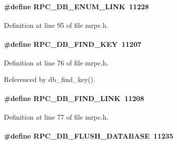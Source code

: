 \paragraph[{RPC\_\-DB\_\-ENUM\_\-LINK}]{\setlength{\rightskip}{0pt plus 5cm}\#define RPC\_\-DB\_\-ENUM\_\-LINK~11228}\hfill\label{group__mrpcdefineh_ga1a6c32657e096d90309072b8baaf6a61}

\begin{DoxyItemize}
\item 
\end{DoxyItemize}

Definition at line 95 of file mrpc.h.
\paragraph[{RPC\_\-DB\_\-FIND\_\-KEY}]{\setlength{\rightskip}{0pt plus 5cm}\#define RPC\_\-DB\_\-FIND\_\-KEY~11207}\hfill\label{group__mrpcdefineh_gaee0b72994ce1f576cf459bc726901ce5}

\begin{DoxyItemize}
\item 
\end{DoxyItemize}

Definition at line 76 of file mrpc.h.

Referenced by db\_\-find\_\-key().
\paragraph[{RPC\_\-DB\_\-FIND\_\-LINK}]{\setlength{\rightskip}{0pt plus 5cm}\#define RPC\_\-DB\_\-FIND\_\-LINK~11208}\hfill\label{group__mrpcdefineh_ga825f105bd510d8624a418ee85b0d0df9}

\begin{DoxyItemize}
\item 
\end{DoxyItemize}

Definition at line 77 of file mrpc.h.
\paragraph[{RPC\_\-DB\_\-FLUSH\_\-DATABASE}]{\setlength{\rightskip}{0pt plus 5cm}\#define RPC\_\-DB\_\-FLUSH\_\-DATABASE~11235}\hfill\label{group__mrpcdefineh_gacd06ddba06cde7c0cd823893e69a3019}

